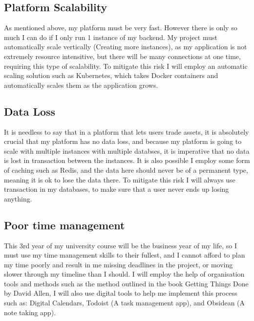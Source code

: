 \documentclass[titlepage]{article}
\begin{document}
\subsection{Platform Scalability}
As mentioned above, my platform must be very fast. However there is only so much I can do if I only run 1 instance of my backend. My project must automatically scale vertically (Creating more instances), as my application is not extremely resource intensitive, but there will be many connections at one time, requiring this type of scalability. To mitigate this risk I will employ an automatic scaling solution such as Kubernetes, which takes Docker containers and automatically scales them as the application grows.

\subsection{Data Loss}
It is needless to say that in a platform that lets users trade assets, it is absolutely crucial that my platform has no data loss, and because my platform is going to scale with multiple instances with multiple databses, it is imperative that no data is lost in transaction between the instances. It is also possible I employ some form of caching such as Redis, and the data here should never be of a permanent type, meaning it is ok to lose the data there. To mitigate this risk I will always use transaction in my databases, to make sure that a user never ends up losing anything.

\subsection{Poor time management}
This 3rd year of my university course will be the business year of my life, so I must use my time management skills to their fullest, and I cannot afford to plan my time poorly and result in me missing deadlines in the project, or moving slower through my timeline than I should. I will employ the help of organisation tools and methods such as the method outlined in the book Getting Things Done by David Allen, I will also use digital tools to help me implement this process such as: Digital Calendars, Todoist (A task management app), and Obsidean (A note taking app).

 

\end{document}
